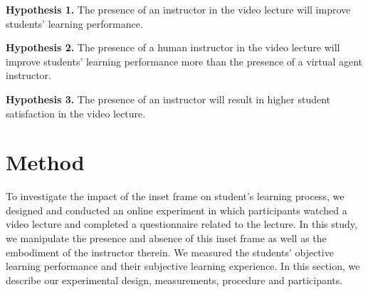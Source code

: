 \documentclass{sigchi}
\begin{document}
\textbf{Hypothesis 1.} The presence of an instructor in the video lecture will improve students' learning performance.

\textbf{Hypothesis 2.}  The presence of a human instructor in the video lecture will improve students' learning performance more than the presence of a virtual agent instructor.

\textbf{Hypothesis 3.} The presence of an instructor will result in higher student satisfaction in the video lecture.


\section{Method}

To investigate the impact of the inset frame on student's learning process, we designed and conducted an online experiment in which participants watched a video lecture and completed a questionnaire related to the lecture. In this study, we manipulate the presence and absence of this inset frame as well as the embodiment of the instructor therein. We measured the students' objective learning performance and their subjective learning experience. In this section, we describe our experimental design, measurements, procedure and participants.

%
%
\end{document}
